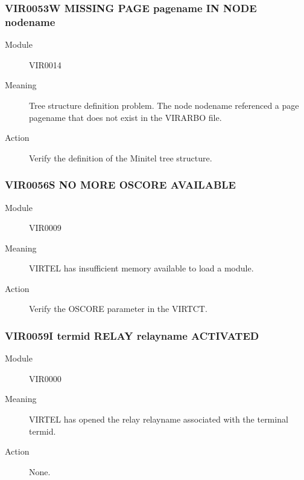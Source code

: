 \documentclass[letterpaper,10pt,english]{sphinxmanual}
\begin{document}
\subsubsection{VIR0053W MISSING PAGE pagename IN NODE nodename}
\label{\detokenize{messages:vir0053w-missing-page-pagename-in-node-nodename}}\begin{description}
\item[{Module}] \leavevmode
VIR0014

\item[{Meaning}] \leavevmode
Tree structure definition problem. The node nodename referenced a page pagename that does not exist in the VIRARBO file.

\item[{Action}] \leavevmode
Verify the definition of the Minitel tree structure.

\end{description}


\subsubsection{VIR0056S NO MORE OSCORE AVAILABLE}
\label{\detokenize{messages:vir0056s-no-more-oscore-available}}\begin{description}
\item[{Module}] \leavevmode
VIR0009

\item[{Meaning}] \leavevmode
VIRTEL has insufficient memory available to load a module.

\item[{Action}] \leavevmode
Verify the OSCORE parameter in the VIRTCT.

\end{description}


\subsubsection{VIR0059I termid RELAY relayname ACTIVATED}
\label{\detokenize{messages:vir0059i-termid-relay-relayname-activated}}\begin{description}
\item[{Module}] \leavevmode
VIR0000

\item[{Meaning}] \leavevmode
VIRTEL has opened the relay relayname associated with the terminal termid.

\item[{Action}] \leavevmode
None.

\end{description}
\end{document}

